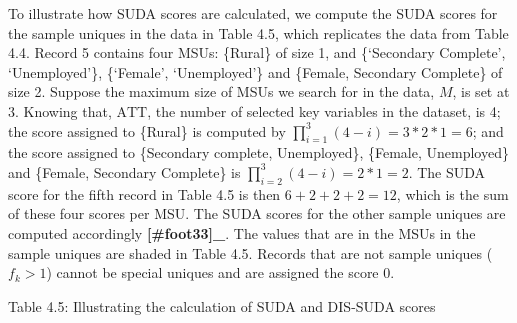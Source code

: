\documentclass[letterpaper,10pt,english]{sphinxmanual}
\begin{document}
To illustrate how SUDA scores are calculated, we compute the SUDA scores
for the sample uniques in the data in Table 4.5, which replicates the
data from Table 4.4. Record 5 contains four MSUs: \{Rural\} of size 1, and
\{‘Secondary Complete’, ‘Unemployed’\}, \{‘Female’, ‘Unemployed’\} and
\{Female, Secondary Complete\} of size 2. Suppose the maximum size of MSUs
we search for in the data, \(M\), is set at 3. Knowing that,
\(\text{ATT}\), the number of selected key variables in the dataset,
is 4; the score assigned to \{Rural\} is computed by
\(\prod_{i = 1}^{3}{(4 - i)} = 3*2*1 = 6\); and the score assigned
to \{Secondary complete, Unemployed\}, \{Female, Unemployed\} and \{Female,
Secondary Complete\} is
\(\prod_{i = 2}^{3}\left( 4 - i \right) = 2*1 = 2\). The SUDA score
for the fifth record in Table 4.5 is then \(6 + 2 + 2 + 2 = 12\),
which is the sum of these four scores per MSU. The SUDA scores for the
other sample uniques are computed accordingly {\color{red}\bfseries{}{[}\#foot33{]}\_}. The
values that are in the MSUs in the sample uniques are shaded in Table
4.5. Records that are not sample uniques (\(f_{k} > 1\)) cannot be
special uniques and are assigned the score 0.

Table 4.5: Illustrating the calculation of SUDA and DIS-SUDA scores
\end{document}

